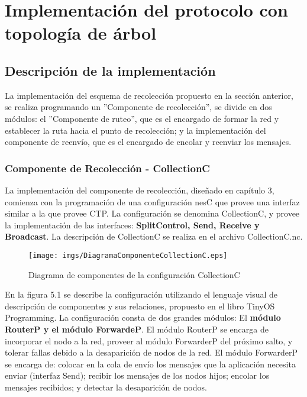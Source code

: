 \chapter{Implementación del protocolo con topología de árbol}

\section{Descripción de la implementación}
La implementación del esquema de recolección propuesto en la sección anterior, se realiza programando un ''Componente de recolección'', se divide en dos módulos:  el ''Componente de ruteo'', que es el encargado de formar la red y establecer la ruta hacia el punto de recolección; y la implementación del componente de reenvío, que es el encargado de encolar y reenviar los mensajes.\\

\subsection{Componente de Recolección - CollectionC}
La implementación del componente de recolección, diseñado en capítulo 3, comienza con la programación de una configuración nesC que provee una interfaz similar a la que provee CTP\cite{TEP123}. La configuración se denomina CollectionC, y provee la implementación de las interfaces: \textbf{SplitControl, Send, Receive y Broadcast}. La descripción  de CollectionC se realiza en el archivo CollectionC.nc.

\begin{figure}[H]
	\centering
 	\texttt{[image: imgs/DiagramaComponenteCollectionC.eps]} 
 	\caption{Diagrama de componentes de la configuración CollectionC}
\end{figure}

En la figura 5.1 se describe la configuración utilizando el lenguaje visual de descripción de componentes y sus relaciones, propuesto en el libro TinyOS Programming\cite{TinyOSProgramming}. La configuración consta de dos grandes módulos: El \textbf{módulo RouterP y el módulo ForwardeP}. El módulo RouterP se encarga de incorporar el nodo a la red, proveer al módulo ForwarderP del próximo salto, y tolerar fallas debido a la desaparición de nodos de la red. El módulo ForwarderP se encarga de: colocar en la cola de envío los mensajes que la aplicación necesita enviar (interfaz Send); recibir los mensajes de los nodos hijos; encolar los mensajes recibidos; y detectar la desaparición de nodos. \\

